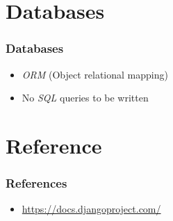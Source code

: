 \documentclass[bigger, presentation]{beamer}
\begin{document}
\section{Databases}
\label{sec-5}
\begin{frame}
\frametitle{Databases}
\label{sec-5-1}

\begin{itemize}
\item \emph{ORM} (Object relational mapping)
\item No \emph{SQL} queries to be written
\end{itemize}
\end{frame}
\section{Reference}
\label{sec-6}
\begin{frame}
\frametitle{References}
\label{sec-6-1}

\begin{itemize}
\item \href{https://docs.djangoproject.com/}{https://docs.djangoproject.com/}
\end{itemize}
\end{frame}
\end{document}
